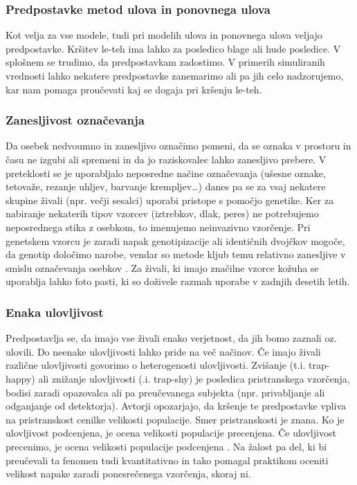 \subsubsection{Predpostavke metod ulova in ponovnega ulova}
Kot velja za vse modele, tudi pri modelih ulova in ponovnega ulova veljajo predpostavke. Kršitev le-teh ima lahko za posledico blage ali hude posledice. V splošnem se trudimo, da predpostavkam zadostimo. V primerih simuliranih vrednosti lahko nekatere predpostavke zanemarimo ali pa jih celo nadzorujemo, kar nam pomaga proučevati kaj se dogaja pri kršenju le-teh.

\subsubsection{Zanesljivost označevanja}
Da osebek nedvoumno in zanesljivo označimo pomeni, da se oznaka v prostoru in času ne izgubi ali spremeni in da jo raziskovalec lahko zanesljivo prebere. V preteklosti se je uporabljalo neposredne načine označevanja (ušesne oznake, tetovaže, rezanje uhljev, barvanje krempljev…) danes pa se za vsaj nekatere skupine živali (npr. večji sesalci) uporabi pristope s pomočjo genetike. Ker za nabiranje nekaterih tipov vzorcev (iztrebkov, dlak, peres) ne potrebujemo neposrednega stika z osebkom, to imenujemo neinvazivno vzorčenje. Pri genetskem vzorcu je zaradi napak genotipizacije ali identičnih dvojčkov mogoče, da genotip določimo narobe, vendar so metode kljub temu relativno zanesljive v smislu označevanja osebkov \citep{waits_noninvasive_2005}. Za živali, ki imajo značilne vzorce kožuha se uporablja lahko foto pasti, ki so doživele razmah uporabe v zadnjih desetih letih.

\subsubsection{Enaka ulovljivost}
Predpostavlja se, da imajo vse živali enako verjetnost, da jih bomo zaznali oz. ulovili. Do neenake ulovljivosti lahko pride na več načinov. Če imajo živali različne ulovljivosti govorimo o heterogenosti ulovljivosti. Zvišanje (t.i. trap-happy) ali znižanje ulovljivosti (.i. trap-shy) je posledica pristranskega vzorčenja, bodisi zaradi opazovalca ali pa preučevanega subjekta (npr. privabljanje ali odganjanje od detektorja). Avtorji opozarjajo, da  kršenje te predpostavke vpliva na pristranskost cenilke velikosti populacije. Smer pristranskosti je znana. Ko je ulovljivost podcenjena, je ocena velikosti populacije precenjena. Če ulovljivost precenimo, je ocena velikosti populacije podcenjena \citep{williams_analysis_2002}. Na žalost pa del, ki bi preučevali ta fenomen tudi kvantitativno in tako pomagal praktikom oceniti velikost napake zaradi ponesrečenega vzorčenja, skoraj ni.


